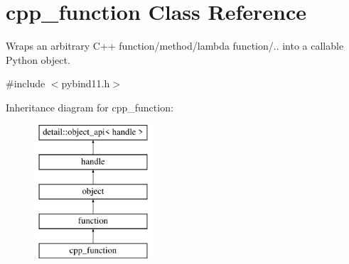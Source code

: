 \hypertarget{classcpp__function}{}\section{cpp\+\_\+function Class Reference}
\label{classcpp__function}


Wraps an arbitrary C++ function/method/lambda function/.. into a callable Python object.  




{\ttfamily \#include $<$pybind11.\+h$>$}

Inheritance diagram for cpp\+\_\+function\+:\begin{figure}[H]
\begin{center}
\leavevmode
\includegraphics[height=5.000000cm]{classcpp__function}
\end{center}
\end{figure}
